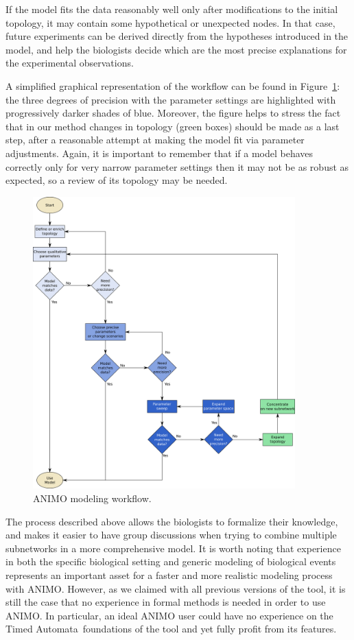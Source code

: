 \documentclass[submission,copyright,creativecommons]{eptcs}
\def\tas{Timed Automata}
\begin{document}
If the model fits the data reasonably well only after modifications to the initial topology, it may contain some hypothetical or unexpected nodes.
In that case, future experiments can be derived directly from the hypotheses introduced in the model, and
help the biologists decide which are the most precise explanations for the experimental observations.

A simplified graphical representation of the workflow can be found in Figure~\ref{fig:workflow}: the three
degrees of precision with the parameter settings are highlighted with progressively darker shades of blue.
Moreover, the figure helps to stress the fact that in our method changes in topology (green boxes) should be made as a
last step, after a reasonable attempt at making the model fit via parameter adjustments.
Again, it is important to remember that if a model behaves correctly only for very narrow parameter settings
then it may not be as robust as expected, so a review of its topology may be needed.

\begin{figure}
\centering
\includegraphics[width=0.9\textwidth]{images/workflow}
\caption{ANIMO modeling workflow.\label{fig:workflow}}
\end{figure}


The process described above allows the biologists to formalize their knowledge,
and makes it easier to have group discussions when trying to combine multiple subnetworks in a more comprehensive model.
It is worth noting that experience in both the specific biological setting and generic modeling of biological
events represents an important asset for a faster and more realistic modeling process with ANIMO. However, as
we claimed with all previous versions of the tool, it is still the case that no experience in formal methods
is needed in order to use ANIMO. In particular, an ideal ANIMO user could have no experience on the \tas\ foundations
of the tool and yet fully profit from its features.
\end{document}
